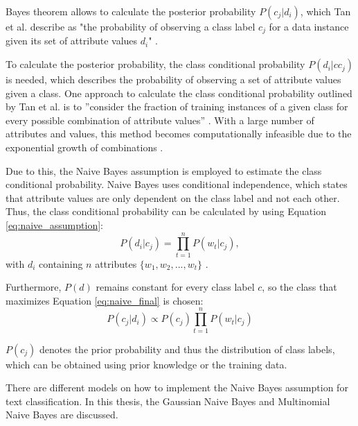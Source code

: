         Bayes theorem allows to calculate the posterior probability $P(c_j|d_i)$, which Tan et al. describe as "the probability of observing a class label $c_j$ for a data instance given its set of attribute values $d_i$" \cite[p.~418]{DBLP:books/aw/TanSKK2019}. 

        To calculate the posterior probability, the class conditional probability $P(d_i|cc_j)$ is needed, which describes the probability of observing a set of attribute values given a class. One approach to calculate the class conditional probability outlined by Tan et al. is to ''consider the fraction of training instances of a given class for every possible combination of attribute values'' \cite[p.~419]{DBLP:books/aw/TanSKK2019}. With a large number of attributes and values, this method becomes computationally infeasible due to the exponential growth of combinations \cite{DBLP:books/aw/TanSKK2019}.

        Due to this, the Naive Bayes assumption is employed to estimate the class conditional probability. Naive Bayes uses conditional independence, which states that attribute values are only dependent on the class label and not each other. Thus, the class conditional probability can be calculated by using Equation \eqref{eq:naive_assumption}:
        \begin{equation}
            \label{eq:naive_assumption}
            P(d_i|c_j) = \prod_{t=1}^{n}P(w_{t}|c_j),
        \end{equation}
        with $d_i$ containing $n$ attributes $\{w_1,w_2,...,w_t\}$ \cite{DBLP:books/aw/TanSKK2019}.

        Furthermore, $P(d)$ remains constant for every class label $c$, so the class that maximizes Equation \eqref{eq:naive_final} is chosen: 
        \begin{equation}
            \label{eq:naive_final}
            P(c_j|d_i)\propto P(c_j)\prod_{t=1}^{n}P(w_{t}|c_j) 
        \end{equation}   
        
        $P(c_j)$ denotes the prior probability and thus the distribution of class labels, which can be obtained using prior knowledge or the training data.
        
        There are different models on how to implement the Naive Bayes assumption for text classification. In this thesis, the Gaussian Naive Bayes and Multinomial Naive Bayes are discussed. 
        
